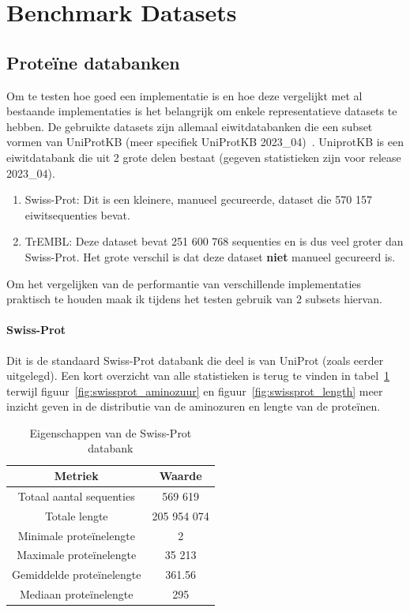 \documentclass[11pt,dutch,faculty=we,layout=titlefont,underline=false,titleUppercase=true,titleUnderline=true]{ugent2016-report}
\begin{document}
    \section{Benchmark Datasets}\label{sec:datasets}

    \subsection{Proteïne databanken}\label{subsec:proteine-databanken}
    Om te testen hoe goed een implementatie is en hoe deze vergelijkt met al bestaande implementaties is het belangrijk om enkele representatieve datasets te hebben.
    De gebruikte datasets zijn allemaal eiwitdatabanken die een subset vormen van UniProtKB (meer specifiek UniProtKB 2023\_04)~\cite{UniprotKB}.
    UniprotKB is een eiwitdatabank die uit 2 grote delen bestaat (gegeven statistieken zijn voor release 2023\_04).
    \begin{enumerate}
        \item Swiss-Prot: Dit is een kleinere, manueel gecureerde, dataset die 570 157 eiwitsequenties bevat.
        \item TrEMBL: Deze dataset bevat 251 600 768 sequenties en is dus veel groter dan Swiss-Prot.
        Het grote verschil is dat deze dataset \textbf{niet} manueel gecureerd is.
    \end{enumerate}
    Om het vergelijken van de performantie van verschillende implementaties praktisch te houden maak ik tijdens het testen gebruik van 2 subsets hiervan.

    \paragraph{Swiss-Prot} Dit is de standaard Swiss-Prot databank die deel is van UniProt (zoals eerder uitgelegd).
    Een kort overzicht van alle statistieken is terug te vinden in tabel~\ref{tab:swissprot_eigenschappen} terwijl figuur~\ref{fig:swissprot_aminozuur} en figuur~\ref{fig:swissprot_length} meer inzicht geven in de distributie van de aminozuren en lengte van de proteïnen.

    \begin{table}[h!]
        \centering
        \begin{tabular}{c c}
            Metriek                   & Waarde      \\
            \hline\hline
            Totaal aantal sequenties  & 569 619     \\
            Totale lengte             & 205 954 074 \\
            Minimale proteïnelengte   & 2           \\
            Maximale proteïnelengte   & 35 213      \\
            Gemiddelde proteïnelengte & 361.56      \\
            Mediaan proteïnelengte    & 295         \\
            \hline
        \end{tabular}
        \caption{Eigenschappen van de Swiss-Prot databank}
        \label{tab:swissprot_eigenschappen}
    \end{table}
\end{document}
